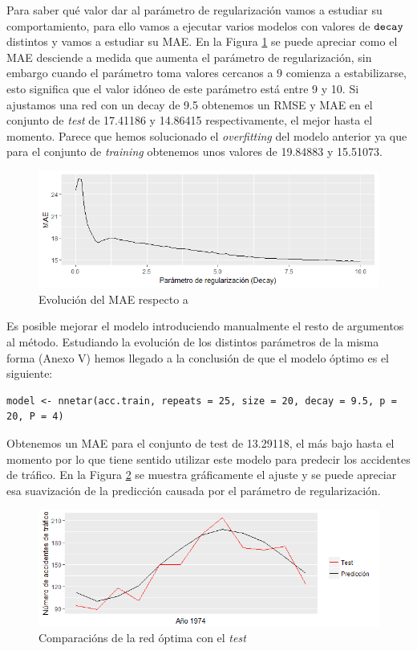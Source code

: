 Para saber qué valor dar al parámetro de regularización  vamos a estudiar su comportamiento, para ello vamos a ejecutar varios modelos con valores de $\verb!decay!$ distintos y vamos a estudiar su MAE. En la Figura \ref{decay} se puede apreciar como el MAE desciende a medida que aumenta el parámetro de regularización, sin embargo cuando el parámetro toma valores cercanos a 9 comienza a estabilizarse, esto significa que el valor idóneo de este parámetro está entre 9 y 10. Si ajustamos una red con un decay de 9.5 obtenemos un RMSE y MAE en el conjunto de \textit{test} de 17.41186 y 14.86415 respectivamente, el mejor hasta el momento. Parece que hemos solucionado el \textit{overfitting} del modelo anterior ya que para el conjunto de \textit{training} obtenemos unos valores de 19.84883 y 15.51073.
\begin{figure}
    \centering
    \centerline{\includegraphics[scale = 0.7]{Images/Modelizacion/315.png}}
    \caption{Evolución del MAE respecto a }
    \label{decay}
\end{figure}

Es posible mejorar el modelo introduciendo manualmente el resto de argumentos al método. Estudiando la evolución de los distintos parámetros de la misma forma (Anexo V) hemos llegado a la conclusión de que el modelo óptimo es el siguiente:
\begin{Verbatim}[fontsize=\footnotesize]
model <- nnetar(acc.train, repeats = 25, size = 20, decay = 9.5, p = 20, P = 4)
\end{Verbatim}

Obtenemos un MAE para el conjunto de test de 13.29118, el más bajo hasta el momento por lo que tiene sentido utilizar este modelo para predecir los accidentes de tráfico. En la Figura \ref{red} se muestra gráficamente el ajuste y se puede apreciar esa suavización de la predicción causada por el parámetro de regularización.
\begin{figure}
    \centering
    \centerline{\includegraphics[scale = 0.7]{Images/Modelizacion/317.png}}
    \caption{Comparacións de la red óptima con el \textit{test}}
    \label{red}
\end{figure}

